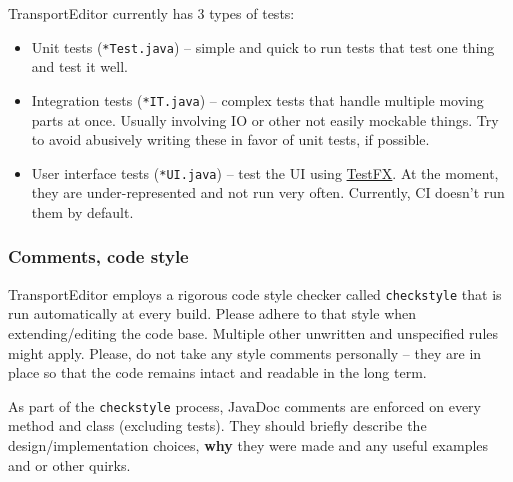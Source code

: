 TransportEditor currently has 3 types of tests:

\begin{itemize}
\item Unit tests (\texttt{*Test.java}) -- simple and quick to run tests that test one thing and test it well.

\item Integration tests (\texttt{*IT.java}) -- complex tests that handle multiple moving parts at once. Usually involving IO or
other not easily mockable things. Try to avoid abusively writing these in favor of unit tests, if possible.

\item User interface tests (\texttt{*UI.java}) -- test the UI using \href{https://github.com/TestFX/TestFX}{TestFX}.
At the moment, they are under-represented and not run very often. Currently, CI doesn't run them by default.
\end{itemize}

\subsubsection*{Comments, code style}
TransportEditor employs a rigorous code style checker called \texttt{checkstyle} that is run automatically at every build.
Please adhere to that style when extending/editing the code base. Multiple other unwritten and unspecified rules might
apply. Please, do not take any style comments personally -- they are in place so that the code remains intact and
readable in the long term.

As part of the \texttt{checkstyle} process, JavaDoc comments are enforced on every method and class (excluding tests).
They should briefly describe the design/implementation choices, \textbf{why} they were made and any useful examples and or
other quirks.


